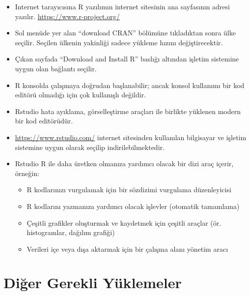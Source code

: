 \documentclass[
  oneside]{book}
\begin{document}
\begin{itemize}
\item
  Internet tarayıcısına R yazılımın internet sitesinin ana sayfasının adresi yazılır. \url{https://www.r-project.org/}
\item
  Sol menüde yer alan ``download CRAN'' bölümüne tıkladıktan sonra ülke seçilir. Seçilen ülkenin yakinliği sadece yükleme hızını değiştirecektir.
\item
  Çıkan sayfada ``Download and Install R'' baslığı altından işletim sistemine uygun olan bağlantı seçilir.
\item
  R konsolda çalışmaya doğrudan başlanabilir; ancak konsol kullanımı bir kod editörü olmadığı için çok kullanışlı değildir.
\item
  Rstudio hata ayıklama, görselleştirme araçları ile birlikte yüklenen modern bir kod editörüdür.
\item
  \url{https://www.rstudio.com/} internet sitesinden kullanılan bilgisayar ve işletim sistemine uygun olarak seçilip indirilebilmektedir.
\item
  Rstudio R ile daha üretken olmanıza yardımcı olacak bir dizi araç içerir, örneğin:

  \begin{itemize}
  \item
    R kodlarınızı vurgulamak için bir sözdizimi vurgulama düzenleyicisi
  \item
    R kodlarını yazmanıza yardımcı olacak işlevler (otomatik tamamlama)
  \item
    Çeşitli grafikler oluşturmak ve kaydetmek için çeşitli araçlar (ör. histogramlar, dağılım grafiği)
  \item
    Verileri içe veya dışa aktarmak için bir çalışma alanı yönetim aracı
  \end{itemize}
\end{itemize}

\hypertarget{diux11fer-gerekli-yuxfcklemeler}{%
\section{Diğer Gerekli Yüklemeler}\label{diux11fer-gerekli-yuxfcklemeler}}
\end{document}
